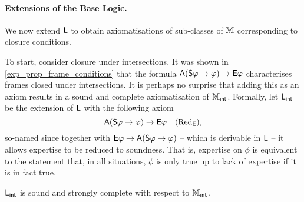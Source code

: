 \paragraph{Extensions of the Base Logic.}

We now extend $\mathsf{L}$ to obtain axiomatisations of sub-classes of $\mathbb{M}$
corresponding to closure conditions.

To start, consider closure under intersections. It was shown in
\cref{exp_prop_frame_conditions} that the formula $\mathsf{A}(\mathsf{S}\varphi \rightarrow
\varphi) \rightarrow \mathsf{E}\varphi$ characterises frames closed under intersections. It is
perhaps no surprise that adding this as an axiom results in a sound and
complete axiomatisation of $\mathbb{M}_{\mathsf{int}}$. Formally, let $\mathsf{L}_{\mathsf{int}}$ be the
extension of $\mathsf{L}$ with the following axiom
\[
    \mathsf{A}(\mathsf{S}\varphi \rightarrow \varphi) \rightarrow \mathsf{E}\varphi \quad (\text{Red}_{\mathsf{E}}),
\]
so-named since together with $\mathsf{E}\varphi \rightarrow \mathsf{A}(\mathsf{S}\varphi \rightarrow \varphi)$
-- which is derivable in $\mathsf{L}$ -- it allows expertise to be reduced
to soundness. That is, expertise on $\phi$ is equivalent to the statement that,
in all situations, $\phi$ is only true up to lack of expertise if it is in fact
true.

\begin{theorem}
\label{exp_thm_mint_axiomatisation}
$\mathsf{L}_{\mathsf{int}}$ is sound and strongly complete with respect to
$\mathbb{M}_{\mathsf{int}}$.
\end{theorem}

